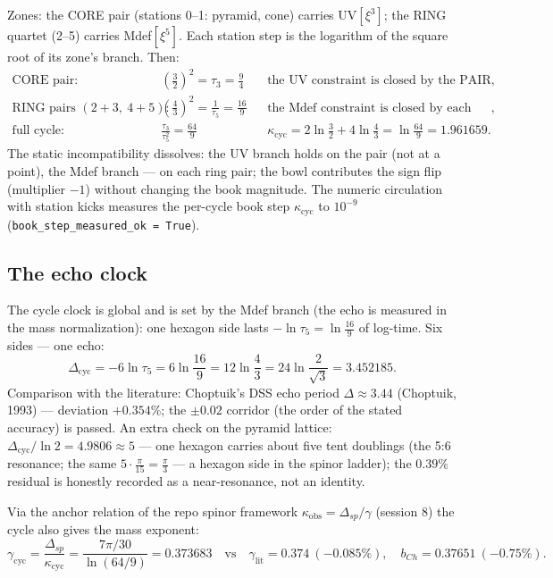 \documentclass[11pt,a4paper]{article}
\newcommand{\kap}{\kappa_{\mathrm{cyc}}}
\newcommand{\Dcy}{\Delta_{\mathrm{cyc}}}
\newcommand{\tauu}{\tau_{3}}
\newcommand{\tauf}{\tau_{5}}
\begin{document}
Zones: the CORE pair (stations 0--1: pyramid, cone) carries UV$[\xi^3]$; the
RING quartet (2--5) carries Mdef$[\xi^5]$. Each station step is the logarithm
of the square root of its zone's branch. Then:
\begin{align}
\text{CORE pair:}\quad & \left(\tfrac32\right)^2 = \tauu = \frac94
   && \text{the UV constraint is closed by the PAIR product},\\
\text{RING pairs } (2{+}3,\ 4{+}5)\text{:}\quad &
   \left(\tfrac43\right)^2 = \frac{1}{\tauf} = \frac{16}{9}
   && \text{the Mdef constraint is closed by each pair},\\
\text{full cycle:}\quad & \frac{\tauu}{\tauf^{2}} = \frac{64}{9}
   && \kap = 2\ln\tfrac32 + 4\ln\tfrac43 = \ln\tfrac{64}{9} = 1.961659.
\end{align}
The static incompatibility dissolves: the UV branch holds on the pair (not at
a point), the Mdef branch --- on each ring pair; the bowl contributes the
sign flip (multiplier $-1$) without changing the book magnitude. The numeric
circulation with station kicks measures the per-cycle book step $\kap$ to
$10^{-9}$ (\texttt{book\_step\_measured\_ok = True}).

\subsection{The echo clock}

The cycle clock is global and is set by the Mdef branch (the echo is measured
in the mass normalization): one hexagon side lasts $-\ln\tauf = \ln\frac{16}{9}$
of log-time. Six sides --- one echo:
\begin{equation}
\Dcy = -6\ln\tauf = 6\ln\frac{16}{9} = 12\ln\frac43 = 24\ln\frac{2}{\sqrt3}
      = 3.452185.
\end{equation}
Comparison with the literature: Choptuik's DSS echo period
$\Delta \approx 3.44$ (Choptuik, 1993) --- deviation $+0.354\%$; the
$\pm0.02$ corridor (the order of the stated accuracy) is passed. An extra
check on the pyramid lattice: $\Dcy/\ln 2 = 4.9806 \approx 5$ --- one hexagon
carries about five tent doublings (the 5:6 resonance; the same
$5\cdot\frac{\pi}{15} = \frac{\pi}{3}$ --- a hexagon side in the spinor
ladder); the $0.39\%$ residual is honestly recorded as a near-resonance, not
an identity.

Via the anchor relation of the repo spinor framework
$\kappa_{\mathrm{obs}} = \Delta_{sp}/\gamma$ (session 8) the cycle also gives
the mass exponent:
\begin{equation}
\gamma_{\mathrm{cyc}} = \frac{\Delta_{sp}}{\kap}
= \frac{7\pi/30}{\ln(64/9)} = 0.373683
\quad \text{vs}\quad \gamma_{\mathrm{lit}} = 0.374\ (-0.085\%),\quad
b_{Ch} = 0.37651\ (-0.75\%).
\end{equation}
\end{document}
